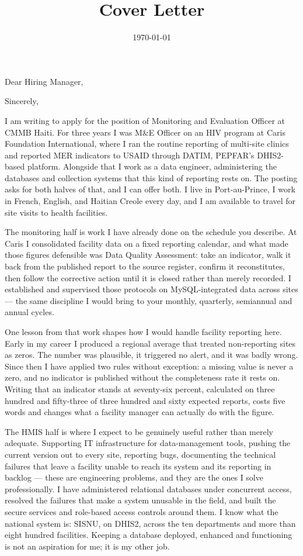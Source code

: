 \documentclass[11pt,a4paper,sans]{moderncv}
\title{Cover Letter}
\begin{document}
\date{\today}
\opening{Dear Hiring Manager,}
\closing{Sincerely,}

\makelettertitle

I am writing to apply for the position of Monitoring and Evaluation Officer at CMMB Haiti. For three years I was M\&E Officer on an HIV program at Caris Foundation International, where I ran the routine reporting of multi-site clinics and reported MER indicators to USAID through DATIM, PEPFAR's DHIS2-based platform. Alongside that I work as a data engineer, administering the databases and collection systems that this kind of reporting rests on. The posting asks for both halves of that, and I can offer both. I live in Port-au-Prince, I work in French, English, and Haitian Creole every day, and I am available to travel for site visits to health facilities.

The monitoring half is work I have already done on the schedule you describe. At Caris I consolidated facility data on a fixed reporting calendar, and what made those figures defensible was Data Quality Assessment: take an indicator, walk it back from the published report to the source register, confirm it reconstitutes, then follow the corrective action until it is closed rather than merely recorded. I established and supervised those protocols on MySQL-integrated data across sites --- the same discipline I would bring to your monthly, quarterly, semiannual and annual cycles.

One lesson from that work shapes how I would handle facility reporting here. Early in my career I produced a regional average that treated non-reporting sites as zeros. The number was plausible, it triggered no alert, and it was badly wrong. Since then I have applied two rules without exception: a missing value is never a zero, and no indicator is published without the completeness rate it rests on. Writing that an indicator stands at seventy-six percent, calculated on three hundred and fifty-three of three hundred and sixty expected reports, costs five words and changes what a facility manager can actually do with the figure.

The HMIS half is where I expect to be genuinely useful rather than merely adequate. Supporting IT infrastructure for data-management tools, pushing the current version out to every site, reporting bugs, documenting the technical failures that leave a facility unable to reach its system and its reporting in backlog --- these are engineering problems, and they are the ones I solve professionally. I have administered relational databases under concurrent access, resolved the failures that make a system unusable in the field, and built the secure services and role-based access controls around them. I know what the national system is: SISNU, on DHIS2, across the ten departments and more than eight hundred facilities. Keeping a database deployed, enhanced and functioning is not an aspiration for me; it is my other job.
\end{document}
